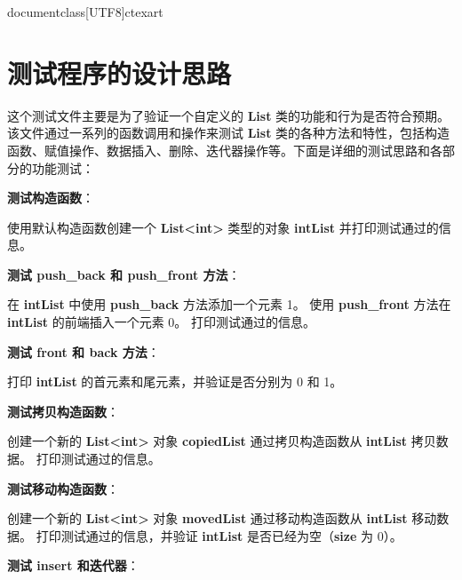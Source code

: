 documentclass[UTF8]{ctexart}
\usepackage{geometry, CJKutf8}
\usepackage[affil-it]{authblk}
\setlength{\topmargin}{-1cm}
\setlength{\paperheight}{29.7cm}
\setlength{\textheight}{25.3cm}

\usepackage{amsfonts}
\usepackage{amsmath}
\usepackage{amssymb}
\usepackage{amsthm}
\usepackage{enumerate}
\usepackage{graphicx}
\usepackage{multicol}
\usepackage{fancyhdr}
\usepackage{layout}
\usepackage{listings}
\usepackage{float, caption}

\lstset{
    basicstyle=\ttfamily, basewidth=0.5em
}



\pagestyle{fancy}
\fancyhead{}

\section{测试程序的设计思路}

这个测试文件主要是为了验证一个自定义的 \textbf{List} 类的功能和行为是否符合预期。该文件通过一系列的函数调用和操作来测试 \textbf{List} 类的各种方法和特性，包括构造函数、赋值操作、数据插入、删除、迭代器操作等。下面是详细的测试思路和各部分的功能测试：

\textbf{测试构造函数}：

使用默认构造函数创建一个 \textbf{List<int>} 类型的对象 \textbf{intList} 并打印测试通过的信息。

\textbf{测试 push\_back 和 push\_front 方法}：

在 \textbf{intList} 中使用 \textbf{push\_back} 方法添加一个元素 1。
使用 \textbf{push\_front} 方法在 \textbf{intList} 的前端插入一个元素 0。
打印测试通过的信息。

\textbf{测试 front 和 back 方法}：

打印 \textbf{intList} 的首元素和尾元素，并验证是否分别为 0 和 1。

\textbf{测试拷贝构造函数}：

创建一个新的 \textbf{List<int>} 对象 \textbf{copiedList} 通过拷贝构造函数从 \textbf{intList} 拷贝数据。
打印测试通过的信息。

\textbf{测试移动构造函数}：

创建一个新的 \textbf{List<int>} 对象 \textbf{movedList} 通过移动构造函数从 \textbf{intList} 移动数据。
打印测试通过的信息，并验证 \textbf{intList} 是否已经为空（\textbf{size} 为 0）。

\textbf{测试 insert 和迭代器}：

